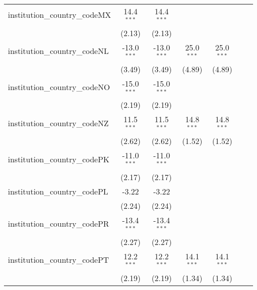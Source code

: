 \begin{tabular}{lcccccc}
   institution\_country\_codeMX          & 14.4$^{***}$  & 14.4$^{***}$  &               &               &               &   \\   
                                         & (2.13)        & (2.13)        &               &               &               &   \\   
   institution\_country\_codeNL          & -13.0$^{***}$ & -13.0$^{***}$ & 25.0$^{***}$  & 25.0$^{***}$  &               &   \\   
                                         & (3.49)        & (3.49)        & (4.89)        & (4.89)        &               &   \\   
   institution\_country\_codeNO          & -15.0$^{***}$ & -15.0$^{***}$ &               &               &               &   \\   
                                         & (2.19)        & (2.19)        &               &               &               &   \\   
   institution\_country\_codeNZ          & 11.5$^{***}$  & 11.5$^{***}$  & 14.8$^{***}$  & 14.8$^{***}$  &               &   \\   
                                         & (2.62)        & (2.62)        & (1.52)        & (1.52)        &               &   \\   
   institution\_country\_codePK          & -11.0$^{***}$ & -11.0$^{***}$ &               &               &               &   \\   
                                         & (2.17)        & (2.17)        &               &               &               &   \\   
   institution\_country\_codePL          & -3.22         & -3.22         &               &               &               &   \\   
                                         & (2.24)        & (2.24)        &               &               &               &   \\   
   institution\_country\_codePR          & -13.4$^{***}$ & -13.4$^{***}$ &               &               &               &   \\   
                                         & (2.27)        & (2.27)        &               &               &               &   \\   
   institution\_country\_codePT          & 12.2$^{***}$  & 12.2$^{***}$  & 14.1$^{***}$  & 14.1$^{***}$  &               &   \\   
                                         & (2.19)        & (2.19)        & (1.34)        & (1.34)        &               &   \\   

\end{tabular}
